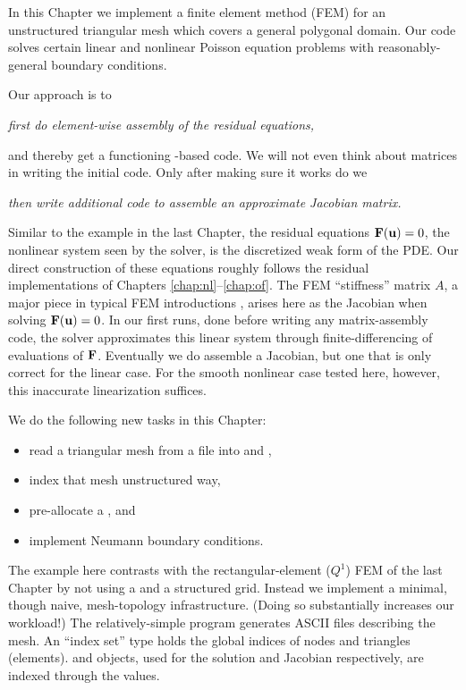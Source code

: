 
In this Chapter we implement a finite element method (FEM) for an unstructured triangular mesh which covers a general polygonal domain.  Our code solves certain linear and nonlinear Poisson equation problems with reasonably-general boundary conditions.

Our approach is to
\begin{center}
\emph{first do element-wise assembly of the residual equations,}
\end{center}
and thereby get a functioning \pSNES-based code.  We will not even think about matrices in writing the initial code.  Only after making sure it works do we
\begin{center}
\emph{then write additional code to assemble an approximate Jacobian matrix.}
\end{center}

Similar to the example in the last Chapter, the residual equations $\mathbf{F}(\mathbf{u})=0$, the nonlinear system seen by the \pSNES solver, is the discretized weak form of the PDE.  Our direct construction of these equations roughly follows the residual implementations of Chapters \ref{chap:nl}--\ref{chap:of}.  The FEM ``stiffness'' matrix $A$, a major piece in typical FEM introductions \citep{Braess2007,Elmanetal2005}, arises here as the Jacobian when solving $\mathbf{F}(\mathbf{u})=0$.  In our first runs, done before writing any matrix-assembly code, the \pSNES solver approximates this linear system through finite-differencing of evaluations of $\mathbf{F}$.  Eventually we do assemble a Jacobian, but one that is only correct for the linear case.  For the smooth nonlinear case tested here, however, this inaccurate linearization suffices.

We do the following new tasks in this Chapter:
\begin{itemize}
\item read a triangular mesh from a file into \PETSc \pVecs and \pISs,
\item index that mesh unstructured way,
\item pre-allocate a \PETSc \pMat, and
\item implement Neumann boundary conditions.
\end{itemize}

The example here contrasts with the rectangular-element ($Q^1$) FEM of the last Chapter by not using a \pDMDA and a structured grid.  Instead we implement a minimal, though naive, mesh-topology infrastructure.  (Doing so substantially increases our workload!)  The relatively-simple \Triangle program generates ASCII files describing the mesh.  An ``index set'' \pIS  type holds the global indices of nodes and triangles (elements).  \pVec and \pMat objects, used for the solution and Jacobian respectively, are indexed through the \pIS values.

